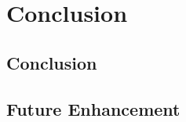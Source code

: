 \chapter{Conclusion}
\section{Conclusion}
\section{Future Enhancement}


\renewcommand\bibname{References} %




